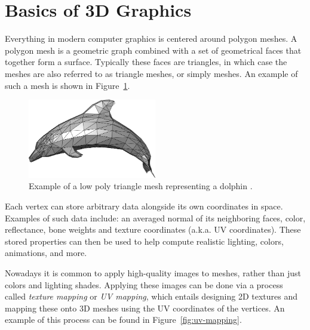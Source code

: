 \section{Basics of 3D Graphics}

Everything in modern computer graphics is centered around polygon meshes.
A polygon mesh is a geometric graph combined with a set of geometrical faces that together form a surface.
Typically these faces are triangles, in which case the meshes are also referred to as triangle meshes, or simply meshes.
An example of such a mesh is shown in Figure~\ref{fig:low_poly_dolphin}.

\begin{figure}[h!]
  \centering

  \includegraphics[width=0.5\textwidth]{figure/low_poly_dolphin.png}
  \caption{Example of a low poly triangle mesh representing a dolphin \cite{low_poly_dolphin}.}

  \label{fig:low_poly_dolphin}
\end{figure}

\newpage
Each vertex can store arbitrary data alongside its own coordinates in space.
Examples of such data include: an averaged normal of its neighboring faces, color, reflectance, bone weights and texture coordinates (a.k.a. UV coordinates).
These stored properties can then be used to help compute realistic lighting, colors, animations, and more.

Nowadays it is common to apply high-quality images to meshes, rather than just colors and lighting shades.
Applying these images can be done via a process called \textit{texture mapping} or \textit{UV mapping}, which entails designing 2D textures and mapping these onto 3D meshes using the UV coordinates of the vertices.
An example of this process can be found in Figure~\ref{fig:uv-mapping}.

